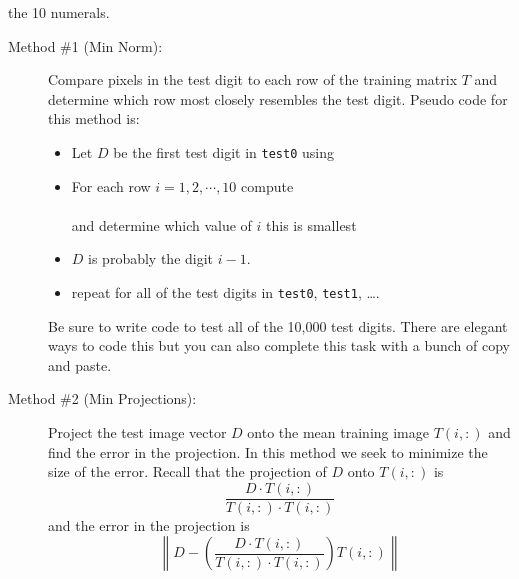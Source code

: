 \begin{problem}
\begin{enumerate}
            the 10 numerals.
            \begin{description}
                \item[Method \#1 (Min Norm):] Compare pixels in the test digit to each row of the
                    training matrix $T$ and determine which row most closely resembles the
                    test digit.  Pseudo code for this method is:
                    \begin{itemize}
                        \item Let $D$ be the first test digit in \texttt{test0} using \\
                        \item For each row $i=1, 2, \cdots, 10$ compute \\
                             \\
                            and determine which value of $i$ this is smallest
                        \item $D$ is probably the digit $i-1$.
                        \item repeat for all of the test digits in \texttt{test0},
                            \texttt{test1}, \ldots.
                    \end{itemize}
                    Be sure to write code to test all of the 10,000 test digits.  There
                    are elegant ways to code this but you can also complete this task with
                    a bunch of copy and paste.
                \item[Method \#2 (Min Projections):] Project the test image vector $D$
                    onto the mean training image $T(i,:)$ and find the error in the
                    projection.  In this method we seek to minimize the size of the error.
                    Recall that the projection of $D$ onto $T(i,:)$ is 
                    \[ \frac{D \cdot T(i,:)}{T(i,:) \cdot T(i,:)} \]
                    and the error in the projection is 
                    \[ \left\| D - \left( \frac{D \cdot T(i,:)}{T(i,:) \cdot T(i,:)} \right)
                    T(i,:) \right\| \]
            \end{description}
    \end{enumerate}
\end{problem}

